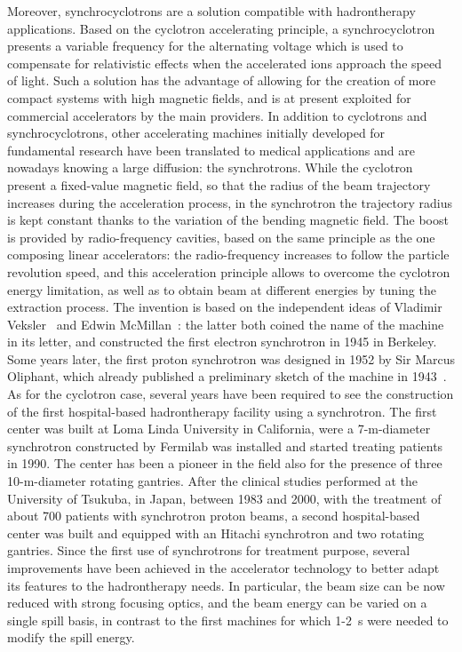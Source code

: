 Moreover, synchrocyclotrons are a solution compatible with hadrontherapy applications. Based on the cyclotron accelerating principle, a synchrocyclotron presents a variable frequency for the alternating voltage which is used to compensate for relativistic effects when the accelerated ions approach the speed of light. Such a solution has the advantage of allowing for the creation of more compact systems with high magnetic fields, and is at present exploited for commercial accelerators by the main providers.  
In addition to cyclotrons and synchrocyclotrons, other accelerating machines  initially developed for fundamental research have been translated to medical applications and are nowadays knowing a large diffusion: the synchrotrons. While the cyclotron present a fixed-value magnetic field, so that the radius of the beam trajectory increases during the acceleration process, in the synchrotron the trajectory radius is kept constant thanks to the variation of the bending magnetic field. The boost is provided by radio-frequency cavities, based on the same principle as the one composing linear accelerators: the radio-frequency increases to follow the particle revolution speed, and this acceleration principle allows to overcome the cyclotron energy limitation, as well as to obtain beam at different energies by tuning the extraction process. The invention is based on the independent ideas of Vladimir Veksler~\parencite{Veksler1944} and Edwin McMillan~\parencite{McMillan1945}: the latter both coined the name of the machine in its letter, and constructed the first electron synchrotron in 1945 in Berkeley. Some years later, the first proton synchrotron was designed in 1952 by Sir Marcus Oliphant, which already published a preliminary sketch of the machine in 1943~\parencite{Oliphant1943}. As for the cyclotron case, several years have been required to see the construction of the first hospital-based hadrontherapy facility using a synchrotron. The first center was built at Loma Linda University in California, were a 7-m-diameter synchrotron constructed by Fermilab was installed and started treating patients in 1990. The center has been a pioneer in the field also for the presence of three 10-m-diameter rotating gantries.  
After the clinical studies performed at the University of Tsukuba, in Japan, between 1983 and 2000, with the treatment of about 700 patients with synchrotron proton beams, a second hospital-based center was built and equipped with an Hitachi synchrotron and two rotating gantries. 
Since the first use of synchrotrons for treatment purpose, several improvements have been achieved in the accelerator technology to better adapt its features to the hadrontherapy needs. In particular, the beam size can be now reduced with strong focusing optics, and the beam energy can be varied on a single spill basis, in contrast to the first machines for which 1-2~s were needed to modify the spill energy.   
